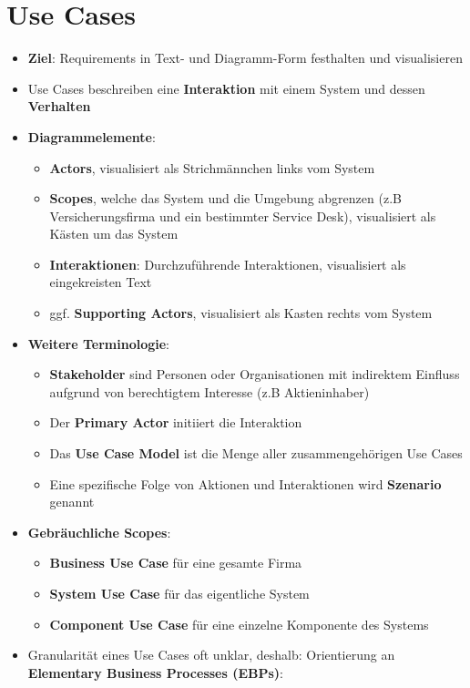 \section{Use Cases}
\label{uc:sec:use_cases}

\begin{itemize}
	\item \textbf{Ziel}: Requirements in Text- und Diagramm-Form festhalten und visualisieren
	\item Use Cases beschreiben eine \textbf{Interaktion} mit einem System und dessen \textbf{Verhalten}
	\item \textbf{Diagrammelemente}:
	\begin{itemize}
		\item \textbf{Actors}, visualisiert als Strichmännchen links vom System
		\item \textbf{Scopes}, welche das System und die Umgebung abgrenzen (z.B Versicherungsfirma und ein bestimmter Service Desk), visualisiert als Kästen um das System
		\item \textbf{Interaktionen}: Durchzuführende Interaktionen, visualisiert als eingekreisten Text
		\item ggf. \textbf{Supporting Actors}, visualisiert als Kasten rechts vom System
	\end{itemize}
	\item \textbf{Weitere Terminologie}:
	\begin{itemize}
		\item \textbf{Stakeholder} sind Personen oder Organisationen mit indirektem Einfluss aufgrund von berechtigtem Interesse (z.B Aktieninhaber)
		\item Der \textbf{Primary Actor} initiiert die Interaktion
		\item Das \textbf{Use Case Model} ist die Menge aller zusammengehörigen Use Cases
		\item Eine spezifische Folge von Aktionen und Interaktionen wird \textbf{Szenario} genannt
	\end{itemize}
	\item \textbf{Gebräuchliche Scopes}:
	\begin{itemize}
		\item \textbf{Business Use Case} für eine gesamte Firma
		\item \textbf{System Use Case} für das eigentliche System
		\item \textbf{Component Use Case} für eine einzelne Komponente des Systems
	\end{itemize}
	\item Granularität eines Use Cases oft unklar, deshalb: Orientierung an \textbf{Elementary Business Processes (EBPs)}:

\end{itemize}

